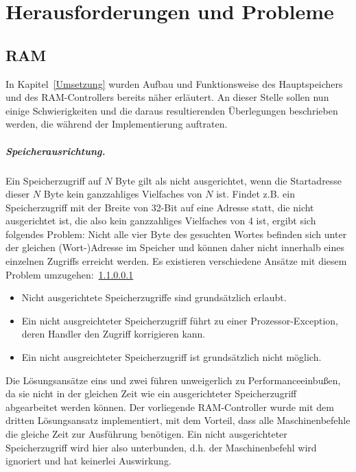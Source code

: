 \chapter{Herausforderungen und Probleme} %
\label{Probleme} %

\section{RAM}

In Kapitel~\ref{Umsetzung} wurden Aufbau und Funktionsweise des Hauptspeichers und des RAM-Controllers bereits näher erläutert.
An dieser Stelle sollen nun einige Schwierigkeiten und die daraus resultierenden Überlegungen beschrieben werden, die während der Implementierung auftraten.

\paragraph{Speicherausrichtung.} 
Ein Speicherzugriff auf $N$ Byte gilt als nicht ausgerichtet, wenn die Startadresse dieser $N$ Byte kein ganzzahliges Vielfaches von $N$ ist.
Findet z.B. ein Speicherzugriff mit der Breite von 32-Bit auf eine Adresse statt, die nicht ausgerichtet ist, die also kein ganzzahliges Vielfaches von 4 ist, ergibt sich folgendes Problem:
Nicht alle vier Byte des gesuchten Wortes befinden sich unter der gleichen (Wort-)Adresse im Speicher und können daher nicht innerhalb eines einzelnen Zugriffs erreicht werden.
Es existieren verschiedene Ansätze mit diesem Problem umzugehen:~\ref{}
\begin{itemize}
    \item Nicht ausgerichtete Speicherzugriffe sind grundsätzlich erlaubt.
    \item Ein nicht ausgreichteter Speicherzugriff führt zu einer Prozessor-Exception, deren Handler den Zugriff korrigieren kann.
    \item Ein nicht ausgreichteter Speicherzugriff ist grundsätzlich nicht möglich.
\end{itemize}

Die Lösungsansätze eins und zwei führen unweigerlich zu Performanceeinbußen, da sie nicht in der gleichen Zeit wie ein ausgerichteter Speicherzugriff abgearbeitet werden können.
Der vorliegende RAM-Controller wurde mit dem dritten Lösungsansatz implementiert, mit dem Vorteil, dass alle Maschinenbefehle die gleiche Zeit zur Ausführung benötigen.
Ein nicht ausgerichteter Speicherzugriff wird hier also unterbunden, d.h. der Maschinenbefehl wird ignoriert und hat keinerlei Auswirkung.

